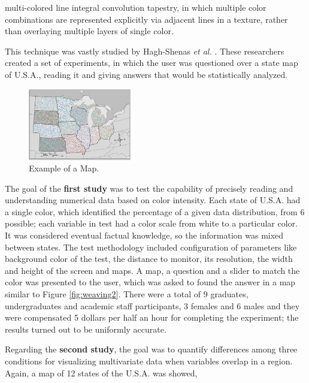 \documentclass{report}
\begin{document}
multi-colored line integral convolution tapestry, in which multiple color combinations are represented
explicitly via adjacent lines in a texture, rather than overlaying multiple layers of single color. \par
This technique was vastly studied by Hagh-Shenas \emph{et al.} \cite{Hagh-Shenas2007}. These researchers created a
set of experiments, in which the user was questioned over a state map of U.S.A., reading it and giving answers
that would be statistically analyzed. \par
%
\begin{figure}
	\centering
    \vspace{-0.8\baselineskip}
    \includegraphics[width=0.4\textwidth]{WeavingTest3.png}
    \caption[Color Weaving - Second Study]{Example of a Map.
    \protect\cite{Hagh-Shenas2007}}
    \label{fig:weaving3}
\end{figure}
%
The goal of the \textbf{first study} was to test the capability of precisely reading and understanding
numerical data based on color intensity. Each state of U.S.A. had a single color, which identified the
percentage of a given data distribution, from 6 possible; each variable in test had a color scale from
white to a particular color. It was considered eventual factual knowledge, so
the information was mixed between states. The test methodology included configuration of parameters like
background color of the test, the distance to monitor, its resolution, the width and height of the screen
and maps. A map, a question and a slider to match the color was presented to the user, which was asked to
found the answer in a map similar to Figure \ref{fig:weaving2}. There were a total of 9 graduates, undergraduates and academic staff
participants, 3 females and 6 males and they were compensated 5 dollars per half an hour for completing
the experiment; the results turned out to be uniformly accurate. \par
Regarding the \textbf{second study}, the goal was to quantify differences among three conditions for visualizing
multivariate data when variables overlap in a region. Again, a map of 12 states of the U.S.A. was showed,
\end{document}
